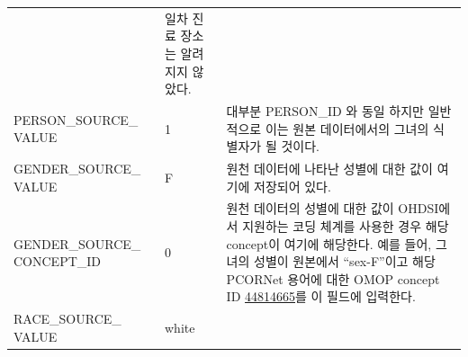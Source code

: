 \documentclass[10.5pt]{book}
\theoremstyle{definition}
\theoremstyle{definition}
\theoremstyle{definition}
\theoremstyle{remark}
\begin{document}
\begin{longtable}[]{@{}lll@{}}
\begin{minipage}[t]{0.16\columnwidth}
\strut
\end{minipage} & \begin{minipage}[t]{0.48\columnwidth}\raggedright\strut
일차 진료 장소는 알려지지 않았다.\strut
\end{minipage}\tabularnewline
\begin{minipage}[t]{0.28\columnwidth}\raggedright\strut
PERSON\_SOURCE\_ VALUE\strut
\end{minipage} & \begin{minipage}[t]{0.16\columnwidth}\raggedright\strut
1\strut
\end{minipage} & \begin{minipage}[t]{0.48\columnwidth}\raggedright\strut
대부분 PERSON\_ID 와 동일 하지만 일반적으로 이는 원본 데이터에서의
그녀의 식별자가 될 것이다.\strut
\end{minipage}\tabularnewline
\begin{minipage}[t]{0.28\columnwidth}\raggedright\strut
GENDER\_SOURCE\_ VALUE\strut
\end{minipage} & \begin{minipage}[t]{0.16\columnwidth}\raggedright\strut
F\strut
\end{minipage} & \begin{minipage}[t]{0.48\columnwidth}\raggedright\strut
원천 데이터에 나타난 성별에 대한 값이 여기에 저장되어 있다.\strut
\end{minipage}\tabularnewline
\begin{minipage}[t]{0.28\columnwidth}\raggedright\strut
GENDER\_SOURCE\_ CONCEPT\_ID\strut
\end{minipage} & \begin{minipage}[t]{0.16\columnwidth}\raggedright\strut
0\strut
\end{minipage} & \begin{minipage}[t]{0.48\columnwidth}\raggedright\strut
원천 데이터의 성별에 대한 값이 OHDSI에서 지원하는 코딩 체계를 사용한
경우 해당 concept이 여기에 해당한다. 예를 들어, 그녀의 성별이 원본에서
``sex-F''이고 해당 PCORNet 용어에 대한 OMOP concept ID
\href{http://athena.ohdsi.org/search-terms/terms/44814665}{44814665}를
이 필드에 입력한다.\strut
\end{minipage}\tabularnewline
\begin{minipage}[t]{0.28\columnwidth}\raggedright\strut
RACE\_SOURCE\_ VALUE\strut
\end{minipage} & \begin{minipage}[t]{0.16\columnwidth}\raggedright\strut
white\strut
\end{minipage} & \begin{minipage}[t]{0.48\columnwidth}\raggedright\strut

\end{minipage}
\end{longtable}
\end{document}

